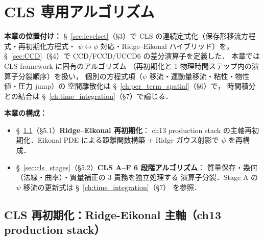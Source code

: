 %
\section{CLS 専用アルゴリズム}
\label{ch:cls_specific}

\noindent\textbf{本章の位置付け：}
§~\ref{sec:levelset}（§3）で CLS の連続定式化（保存形移流方程式・再初期化方程式・
$\psi\leftrightarrow\phi$ 対応・Ridge--Eikonal ハイブリッド）を，
§~\ref{sec:CCD}（§4）で CCD/FCCD/UCCD6 の差分演算子を定義した．
本章では CLS framework に固有のアルゴリズム
（再初期化と 1 物理時間ステップ内の演算子分裂順序）を扱い，
個別の方程式項（$\psi$ 移流・運動量移流・粘性・物性値・圧力 jump）の
空間離散化は §~\ref{ch:per_term_spatial}（§6）で，
時間積分との結合は §~\ref{ch:time_integration}（§7）で論じる．

\noindent\textbf{本章の構成：}
\begin{itemize}
  \item \S~\ref{sec:cls_compression}（§5.1）\textbf{Ridge--Eikonal 再初期化}：
        ch13 production stack の主軸再初期化．Eikonal PDE による距離関数構築 +
        Ridge ガウス射影で $\psi$ を再構成．
  \item \S~\ref{sec:cls_stages}（§5.2）\textbf{CLS A--F 6 段階アルゴリズム}：
        質量保存・幾何（法線・曲率）・質量補正の 3 責務を独立処理する
        演算子分裂．Stage A の $\psi$ 移流の更新式は §~\ref{ch:time_integration}（§7）
        を参照．
\end{itemize}

\subsection{CLS 再初期化：Ridge-Eikonal 主軸（ch13 production stack）}
\label{sec:cls_compression}

